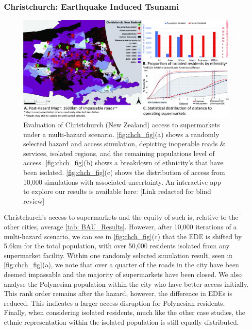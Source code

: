 \documentclass[review,3p,times,onecolumn,sort&compress,12pt]{elsarticle}
\begin{document}
\subsubsection{Christchurch: Earthquake Induced Tsunami}
\begin{figure}[h!]
    \includegraphics[width=1\linewidth]{report/fig/ch_fig.jpg}
    \caption{Evaluation of Christchurch (New Zealand) access to supermarkets under a multi-hazard scenario. \autoref{fig:chch_fig}(a) shows a randomly selected hazard and access simulation, depicting inoperable roads \& services, isolated regions, and the remaining populations level of access. \autoref{fig:chch_fig}(b) shows a breakdown of ethnicity's that have been isolated. \autoref{fig:chch_fig}(c) shows the distribution of access from 10,000 simulations with associated uncertainty. An interactive app to explore our results is available here: [Link redacted for blind review]}
    \label{fig:chch_fig}
\end{figure}

Christchurch's access to supermarkets and the equity of such is, relative to the other cities, average \autoref{tab: BAU_Results}. 
However, after 10,000 iterations of a multi-hazard scenario, we can see in \autoref{fig:chch_fig}(c) that the EDE is shifted by 5.6km for the total population, with over 50,000 residents isolated from any supermarket facility.
Within one randomly selected simulation result, seen in \autoref{fig:chch_fig}(a), we note that over a quarter of the roads in the city have been deemed impassable and the majority of supermarkets have been closed.
We also analyse the Polynesian population within the city who have better access initially.
This rank order remains after the hazard, however, the difference in EDEs is reduced.
This indicates a larger access disruption for Polynesian residents.
Finally, when considering isolated residents, much like the other case studies, the ethnic representation within the isolated population is still equally distributed.
\end{document}
